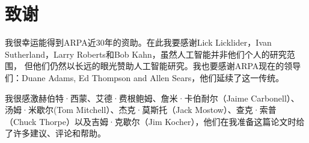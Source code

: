 \documentclass[12pt,a4paper]{article}
\begin{document}
\section{致谢}

我很幸运能得到ARPA近30年的资助。在此我要感谢Lick Licklider，Ivan
Sutherland，Larry Roberts和Bob Kahn，虽然人工智能并非他们个人的研究范围，
但他们仍然以长远的眼光赞助人工智能研究。我也要感谢ARPA现在的领导
们：Duane Adams, Ed Thompson and Allen Sears，他们延续了这一传统。

我很感激赫伯特·西蒙、艾德·费根鲍姆、詹米·卡伯耐尔（Jaime Carbonell）、
汤姆·米歇尔(Tom Mitchell）、杰克·莫斯托（Jack Mostow）、查克·索普
（Chuck Thorpe）以及吉姆·克歇尔（Jim Kocher），他们在我准备这篇论文时给
了许多建议、评论和帮助。
\end{document}
